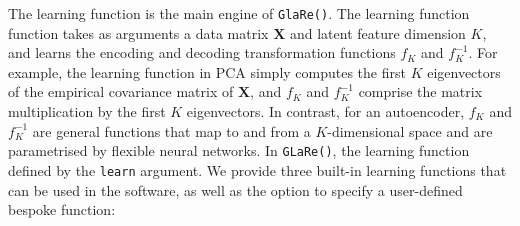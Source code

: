 The learning function is the main engine of \texttt{GlaRe()}.
The learning function function takes as arguments a data matrix $\mathbf{X}$ and latent feature dimension $K$, and learns the encoding and decoding transformation functions $f_K$ and $f_K^{-1}$.
For example, the learning function in PCA simply computes the first $K$ eigenvectors of the empirical covariance matrix of $\mathbf{X}$, and $f_K$ and $f_K^{-1}$ comprise the matrix multiplication by the first $K$ eigenvectors.
In contrast, for an autoencoder, $f_K$ and $f_K^{-1}$ are general functions that map to and from a $K$-dimensional space and are parametrised by flexible neural networks.
In \texttt{GLaRe()}, the learning function defined by the \texttt{learn} argument. We provide three built-in learning functions that can be used in the software, as well as the option to specify a user-defined bespoke function:

